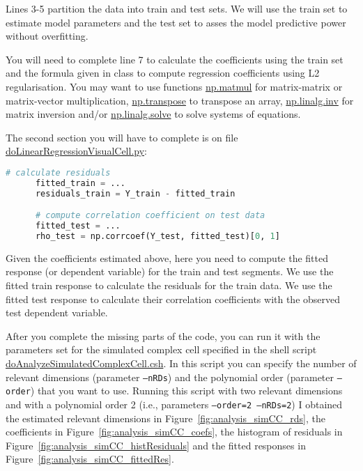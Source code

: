 \documentclass[12pt]{article}
\begin{document}
Lines 3-5 partition the data into train and test sets. We will use the train
set to estimate model parameters and the test set to asses the model predictive
power without overfitting.

You will need to complete line 7 to calculate the coefficients using the train
set and the formula given in class to compute regression coefficients using
L2 regularisation. You may want to use functions
\href{https://numpy.org/doc/stable/reference/generated/numpy.matmul.html}{np.matmul} for
matrix-matrix or matrix-vector multiplication,
\href{https://numpy.org/doc/stable/reference/generated/numpy.transpose.html}{np.transpose}
to transpose an array,
\href{https://numpy.org/doc/stable/reference/generated/numpy.linalg.inv.html}{np.linalg.inv}
for matrix inversion and/or
\href{https://numpy.org/doc/stable/reference/generated/numpy.linalg.solve.html}{np.linalg.solve}
to solve systems of equations.

The second section you will have to complete is on file
\href{https://github.com/joacorapela/neuroinformatics24/blob/master/worksheets/06_linearRegression/code/scripts/https://github.com/joacorapela/neuroinformatics24/blob/master/worksheets/06_linearRegression/code/scripts/doLinearRegressionVisualCell.py}{doLinearRegressionVisualCell.py}:

\begin{lstlisting}[language=python]
      # calculate residuals
      fitted_train = ...
      residuals_train = Y_train - fitted_train

      # compute correlation coefficient on test data
      fitted_test = ...
      rho_test = np.corrcoef(Y_test, fitted_test)[0, 1]
\end{lstlisting}

Given the coefficients estimated above, here you need to compute the fitted
response (or dependent variable) for the train and test segments. We use the
fitted train response to calculate the residuals for the train data. We use the
fitted test response to calculate their correlation coefficients with the
observed test dependent variable.

After you complete the missing parts of the code, you can run it with the
parameters set for the simulated complex cell specified in the shell script
\href{https://github.com/joacorapela/neuroinformatics24/blob/master/worksheets/06_linearRegression/code/scripts/doAnalyzeSimulatedComplexCell.csh}{doAnalyzeSimulatedComplexCell.csh}.
In this script you can specify the number of relevant dimensions (parameter
\texttt{--nRDs}) and the polynomial order (parameter \texttt{--order}) that you
want to use. Running this script with two relevant dimensions and with a
polynomial order 2 (i.e., parameters \texttt{--order=2 --nRDs=2}) I obtained the
estimated relevant dimensions in Figure~\ref{fig:analysis_simCC_rds}, the coefficients
in Figure~\ref{fig:analysis_simCC_coefs}, the histogram of residuals in
Figure~\ref{fig:analysis_simCC_histResiduals} and the fitted responses in
Figure~\ref{fig:analysis_simCC_fittedRes}.
\end{document}
